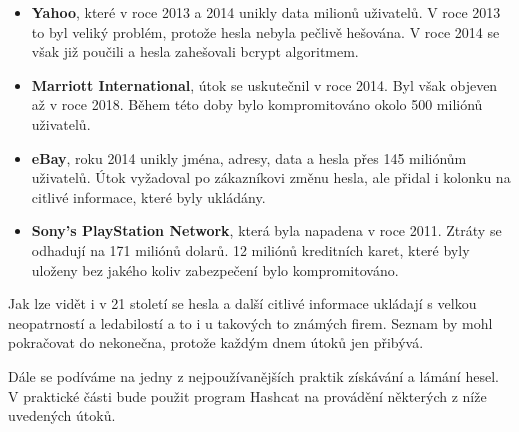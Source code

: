 \begin{itemize}
	\item \textbf{Yahoo}, které v roce 2013 a 2014 unikly data milionů uživatelů. V roce 2013 to byl veliký problém, protože hesla nebyla pečlivě hešována. V roce 2014 se však již poučili a hesla zahešovali bcrypt algoritmem.
	\item \textbf{Marriott International}, útok se uskutečnil v roce 2014. Byl však objeven až v roce 2018. Během této doby bylo kompromitováno okolo 500 miliónů uživatelů. 
	\item \textbf{eBay}, roku 2014 unikly jména, adresy, data a hesla přes 145 miliónům uživatelů. Útok vyžadoval po zákazníkovi změnu hesla, ale přidal i kolonku na citlivé informace, které byly ukládány. 
	\item \textbf{Sony's PlayStation Network}, která byla napadena v roce 2011. Ztráty se odhadují na 171 miliónů dolarů. 12 miliónů kreditních karet, které byly uloženy bez jakého koliv zabezpečení bylo kompromitováno.
\end{itemize}

Jak lze vidět i v 21 století se hesla a další citlivé informace ukládají s velkou neopatrností a ledabilostí a to i u takových to známých firem. Seznam by mohl pokračovat do nekonečna, protože každým dnem útoků jen přibývá. 

Dále se podíváme na jedny z nejpoužívanějších praktik získávání a lámání hesel. V praktické části bude použit program Hashcat na provádění některých z níže uvedených útoků.


